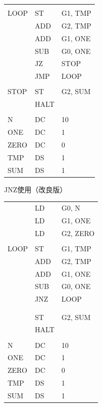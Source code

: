 \documentclass[handout]{beamer}        %
\begin{document}
\begin{frame}
\begin{minipage}{0.36\columnwidth}
{\begin{tabular}{|l|l|l|}
              &        &          \\
      LOOP    & ST     & G1, TMP  \\
              & ADD    & G2, TMP  \\
              & ADD    & G1, ONE  \\
              & SUB    & G0, ONE  \\
              & JZ     & STOP     \\
              & JMP    & LOOP     \\
              &        &          \\
      STOP    & ST     & G2, SUM  \\
              & HALT   &          \\
              &        &          \\
      N       & DC     & 10       \\
      ONE     & DC     & 1        \\
      ZERO    & DC     & 0        \\
      TMP     & DS     & 1        \\
      SUM     & DS     & 1        \\
    \end{tabular}}
  \end{minipage}
  \begin{minipage}{0.36\columnwidth}
    {\ttfamily JNZ使用（改良版）\\\scriptsize
      \begin{tabular}{|l|l|l|}
              & LD     & G0, N    \\
              & LD     & G1, ONE  \\
              & LD     & G2, ZERO \\
              &        &          \\
      LOOP    & ST     & G1, TMP  \\
              & ADD    & G2, TMP  \\
              & ADD    & G1, ONE  \\
              & SUB    & G0, ONE  \\
              & JNZ    & LOOP     \\
              &        &          \\
              &        &          \\
              & ST     & G2, SUM  \\
              & HALT   &          \\
              &        &          \\
      N       & DC     & 10       \\
      ONE     & DC     & 1        \\
      ZERO    & DC     & 0        \\
      TMP     & DS     & 1        \\
      SUM     & DS     & 1        \\
    \end{tabular}}
  \end{minipage}
  \vfill
\end{frame}
\end{document}
